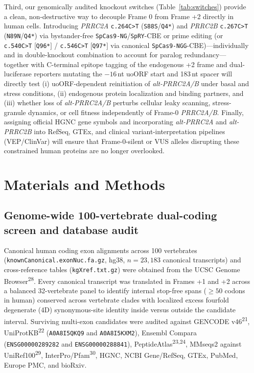 \documentclass[10pt,letterpaper]{article}
\newcommand{\gene}[1]{\textit{#1}}
\newcommand{\refsup}[1]{\textsuperscript{#1}}
\begin{document}
Third, our genomically audited knockout switches (Table~\ref{tab:switches}) provide a clean, non-destructive way to decouple Frame 0 from Frame +2 directly in human cells. Introducing \gene{PRRC2A} \texttt{c.264C>T} (\texttt{S88S}/\texttt{Q4*}) and \gene{PRRC2B} \texttt{c.267C>T} (\texttt{N89N}/\texttt{Q4*}) via bystander-free \texttt{SpCas9-NG}/\texttt{SpRY}-CBE or prime editing (or \texttt{c.540C>T} [\texttt{Q96*}] / \texttt{c.546C>T} [\texttt{Q97*}] via canonical \texttt{SpCas9-NGG}-CBE)---individually and in double-knockout combination to account for paralog redundancy---together with C-terminal epitope tagging of the endogenous +2 frame and dual-luciferase reporters mutating the $-16$\,nt uoORF start and 183\,nt spacer will directly test (i) uoORF-dependent reinitiation of \gene{alt-PRRC2A/B} under basal and stress conditions, (ii) endogenous protein localization and binding partners, and (iii) whether loss of \gene{alt-PRRC2A/B} perturbs cellular leaky scanning, stress-granule dynamics, or cell fitness independently of Frame-0 \gene{PRRC2A/B}. Finally, assigning official HGNC gene symbols and incorporating \gene{alt-PRRC2A} and \gene{alt-PRRC2B} into RefSeq, GTEx, and clinical variant-interpretation pipelines (VEP/ClinVar) will ensure that Frame-0-silent or VUS alleles disrupting these constrained human proteins are no longer overlooked.

\newpage
\section{Materials and Methods}

\subsection{Genome-wide 100-vertebrate dual-coding screen and database audit}

Canonical human coding exon alignments across 100 vertebrates (\texttt{knownCanonical.exonNuc.fa.gz}, hg38, $n = 23,183$ canonical transcripts) and cross-reference tables (\texttt{kgXref.txt.gz}) were obtained from the UCSC Genome Browser\refsup{28}. Every canonical transcript was translated in Frames +1 and +2 across a balanced 32-vertebrate panel to identify internal stop-free spans ($\ge 50$ codons in human) conserved across vertebrate clades with localized excess fourfold degenerate (4D) synonymous-site identity inside versus outside the candidate interval. Surviving multi-exon candidates were audited against GENCODE v46\refsup{21}, UniProtKB\refsup{22} (\texttt{A0A8I5QKQ9} and \texttt{A0A8I5KXM2}), Ensembl Compara (\texttt{ENSG00000289282} and \texttt{ENSG00000288841}), PeptideAtlas\refsup{23,24}, MMseqs2 against UniRef100\refsup{29}, InterPro/Pfam\refsup{30}, HGNC, NCBI Gene/RefSeq, GTEx, PubMed, Europe PMC, and bioRxiv.
\end{document}
